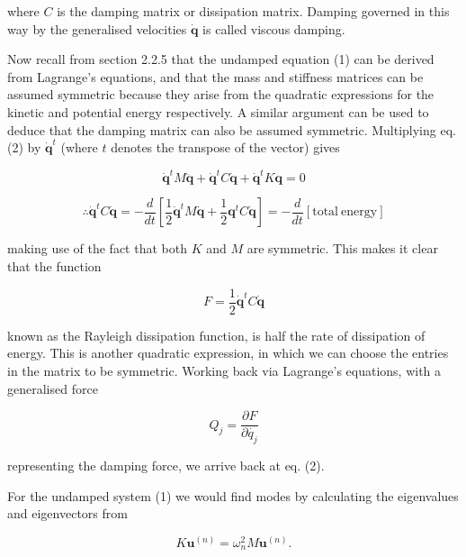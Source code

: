   \noindent{}where $C$ is the damping matrix or dissipation matrix. Damping 
  governed in this way by the generalised velocities $\dot{\mathbf{q}}$ is 
  called viscous damping. 

  Now recall from section 2.2.5 that the undamped equation (1) can be derived 
  from Lagrange's equations, and that the mass and stiffness matrices can be 
  assumed symmetric because they arise from the quadratic expressions for the 
  kinetic and potential energy respectively. A similar argument can be used to 
  deduce that the damping matrix can also be assumed symmetric. Multiplying eq. 
  (2) by $\dot{\mathbf{q}}^t$ (where $t$ denotes the transpose of the vector) 
  gives 

  \begin{equation*}\dot{\mathbf{q}}^t M \ddot{\mathbf{q}} + \dot{\mathbf{q}}^t 
  C \dot{\mathbf{q}} + \dot{\mathbf{q}}^t K \mathbf{q}= 0\end{equation*} 

  \begin{equation*}\therefore \dot{\mathbf{q}}^t C \dot{\mathbf{q}} = 
  -\dfrac{d}{dt}\left[ \dfrac{1}{2}\dot{\mathbf{q}}^t M \dot{\mathbf{q}} + 
  \dfrac{1}{2}\mathbf{q}^t C \dot{\mathbf{q}}\right] = -\dfrac{d}{dt}\left[ 
  \mathrm{total~energy} \right] \tag{3}\end{equation*} 

  \noindent{}making use of the fact that both $K$ and $M$ are symmetric. This 
  makes it clear that the function 

  \begin{equation*}F= \dfrac{1}{2} \dot{\mathbf{q}}^t C \dot{\mathbf{q}} 
  \tag{4}\end{equation*} 

  \noindent{}known as the Rayleigh dissipation function, is half the rate of 
  dissipation of energy. This is another quadratic expression, in which we can 
  choose the entries in the matrix to be symmetric. Working back via Lagrange's 
  equations, with a generalised force 

  \begin{equation*}Q_j=\dfrac{\partial F}{\partial \dot{q_j}} 
  \tag{5}\end{equation*} 

  \noindent{}representing the damping force, we arrive back at eq. (2). 

  For the undamped system (1) we would find modes by calculating the 
  eigenvalues and eigenvectors from 

  \begin{equation*}K \mathbf{u}^{(n)}=\omega_n^2 M \mathbf{u}^{(n)} . 
  \tag{6}\end{equation*} 

